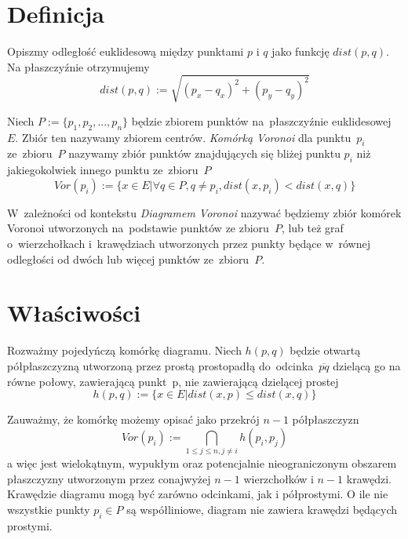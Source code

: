 \documentclass[skorowidz,autorrok,backref,xodstep,oswiadczenie]{wmimgr}
\begin{document}
\section{Definicja}

Opiszmy odległość euklidesową między punktami $p$ i $q$ jako funkcję $dist(p,q)$. Na płaszczyźnie otrzymujemy
\begin{equation}
dist(p,q) := \sqrt{( p_{x} - q_{x} )^2 + (p_{y} - q_{y})^2}
\end{equation}

Niech $P:=\{ p_{1},p_{2},...,p_{n} \}$ będzie zbiorem punktów na~płaszczyźnie euklidesowej $E$. Zbiór ten nazywamy zbiorem centrów. \emph{Komórką Voronoi} dla punktu~$p_{i}$ ze~zbioru~$P$ nazywamy zbiór punktów znajdujących się bliżej punktu $p_{i}$ niż jakiegokolwiek innego punktu ze~zbioru~$P$
\begin{equation}
Vor(p_{i}) := \{ x \in E | \forall q \in P, q \neq p_{i}, dist(x,p_{i}) < dist(x,q) \}
\end{equation}

W~zależności od kontekstu \emph{Diagramem Voronoi} nazywać będziemy zbiór komórek Voronoi utworzonych na~podstawie punktów ze zbioru~$P$, lub też graf o~wierzchołkach i~krawędziach utworzonych przez punkty będące w~równej odległości od dwóch lub więcej punktów ze~zbioru~$P$.

\section{Właściwości}

Rozważmy pojedyńczą komórkę diagramu. Niech $h(p,q)$ będzie otwartą półpłaszczyzną utworzoną przez prostą prostopadłą do~odcinka~$\overline{pq}$ dzielącą go na równe połowy, zawierającą punkt~p, nie zawierającą dzielącej prostej
\begin{equation}
h(p,q) := \{ x \in E | dist(x,p) \leq dist(x,q) \}
\end{equation}

Zauważmy, że komórkę możemy opisać jako przekrój $n-1$ półpłaszczyzn
\begin{equation}
Vor(p_{i}) := \bigcap_{1 \leq j \leq n, j \neq i} h(p_{i},p_{j})
\end{equation}
a więc jest wielokątnym, wypukłym oraz potencjalnie nieograniczonym obszarem płaszczyzny utworzonym przez conajwyżej $n-1$ wierzchołków i $n-1$ krawędzi. Krawędzie diagramu mogą być zarówno odcinkami, jak i półprostymi. O ile nie wszystkie punkty $p_{i} \in P$ są współliniowe, diagram nie zawiera krawędzi będących prostymi.
\end{document}
